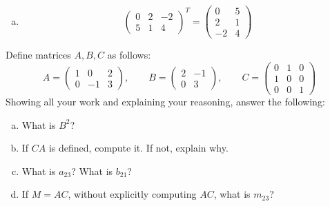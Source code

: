 \documentclass[11pt,letterpaper]{article}
\begin{document}
\begin{enumerate}[(a)]
\item 
	\[
	\begin{pmatrix} 0 & 2 & -2 \\ 5 & 1 & 4 \end{pmatrix}^T= \begin{pmatrix} 0 & 5 \\ 2 & 1 \\ -2 & 4 \end{pmatrix}
	\]
\end{enumerate}



\newpage



 Define matrices $A, B, C$ as follows:
	\[
	A= \begin{pmatrix} 1 & 0 & 2 \\ 0 & -1 & 3 \end{pmatrix}, \qquad B= \begin{pmatrix} 2 & -1 \\ 0 & 3 \end{pmatrix}, \qquad C= \begin{pmatrix} 0 & 1 & 0 \\ 1 & 0 & 0 \\ 0 & 0 & 1 \end{pmatrix}
	\]
Showing all your work and explaining your reasoning, answer the following:
        \begin{enumerate}[(a)]
        \item What is $B^2$?
        \item If $CA$ is defined, compute it. If not, explain why. 
        \item What is $a_{23}$? What is $b_{21}$?
        \item If $M= AC$, without explicitly computing $AC$, what is $m_{23}$?
        \end{enumerate} \pspace
\end{document}
